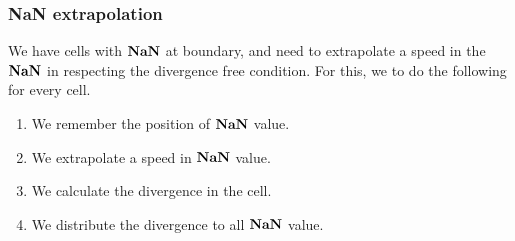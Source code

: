 \subsubsection{NaN extrapolation}

We have cells with $\mathop{\textbf{NaN}}$ at boundary, and need to extrapolate a speed in the $\mathop{\textbf{NaN}}$ in respecting the divergence free condition.
For this, we to do the following for every cell.
\begin{enumerate}
\item We remember the position of $\mathop{\textbf{NaN}}$ value.
\item We extrapolate a speed in $\mathop{\textbf{NaN}}$ value.
\item We calculate the divergence in the cell.
\item We distribute the divergence to all $\mathop{\textbf{NaN}}$ value.
\end{enumerate}

